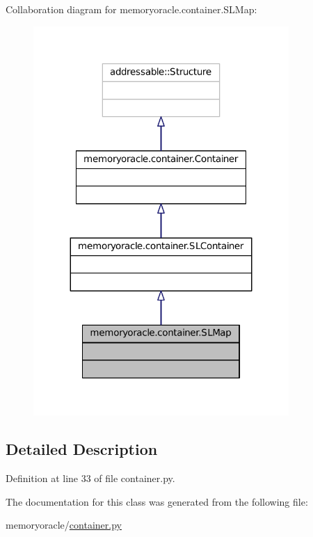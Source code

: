 Collaboration diagram for memoryoracle.\+container.\+S\+L\+Map\+:\nopagebreak
\begin{figure}[H]
\begin{center}
\leavevmode
\includegraphics[width=275pt]{classmemoryoracle_1_1container_1_1SLMap__coll__graph}
\end{center}
\end{figure}


\subsection{Detailed Description}


Definition at line 33 of file container.\+py.



The documentation for this class was generated from the following file\+:\begin{DoxyCompactItemize}
\item 
memoryoracle/\hyperlink{container_8py}{container.\+py}\end{DoxyCompactItemize}
